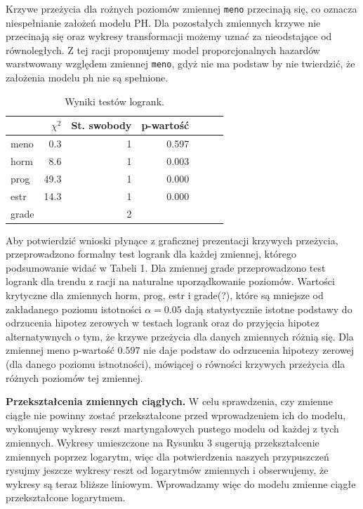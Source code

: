 \documentclass[]{article}
\begin{document}
Krzywe przeżycia dla rożnych poziomów zmiennej \texttt{meno} przecinają
się, co oznacza niespełnianie założeń modelu PH. Dla pozostałych
zmiennych krzywe nie przecinają się oraz wykresy transformacji możemy
uznać za nieodstające od równoległych. Z tej racji proponujemy model
proporcjonalnych hazardów warstwowany względem zmiennej \texttt{meno},
gdyż nie ma podstaw by nie twierdzić, że założenia modelu ph nie są
spełnione.

\begin{table}
\vspace{-20pt}
\caption{ Wyniki testów logrank. }
\begin{tabular}{lrrrrrr}
\toprule%
\ &$\chi^2$&St. swobody&p-wartość\\ \toprule meno&0.3&1&0.597\\ horm&8.6&1&0.003\\ prog&49.3&1&0.000\\ estr&14.3&1&0.000\\ grade&&2&\\  \bottomrule
\end{tabular}
\vspace{-7.5pt}
\end{table}

Aby potwierdzić wnioski płynące z graficznej prezentacji krzywych
przeżycia, przeprowadzono formalny test logrank dla każdej zmiennej,
którego podsumowanie widać w Tabeli 1. Dla zmiennej grade przeprowadzono
test logrank dla trendu z racji na naturalne uporządkowanie poziomów.
Wartości krytyczne dla zmiennych \textsf{horm}, \textsf{prog},
\textsf{estr} i \textsf{grade}(?), które są mniejsze od zakładanego
poziomu istotności \(\alpha=0.05\) dają statystycznie istotne podstawy
do odrzucenia hipotez zerowych w testach logrank oraz do przyjęcia
hipotez alternatywnych o tym, że krzywe przeżycia dla danych zmiennych
różnią się. Dla zmiennej \textsf{meno} p-wartość \(0.597\) nie daje
podstaw do odrzucenia hipotezy zerowej (dla danego poziomu istnotności),
mówiącej o równości krzywych przeżycia dla różnych poziomów tej
zmiennej.

\newpage
\textbf{Przekształcenia zmiennych ciągłych.} \newline
W celu sprawdzenia, czy zmienne ciągłe nie powinny zostać przekształcone
przed wprowadzeniem ich do modelu, wykonujemy wykresy reszt
martyngałowych pustego modelu od każdej z tych zmiennych. Wykresy
umieszczone na Rysunku 3 sugerują przekształcenie zmiennych poprzez
logarytm, więc dla potwierdzenia naszych przypuszczeń rysujmy jeszcze
wykresy reszt od logarytmów zmiennych i obserwujemy, że wykresy są teraz
bliższe liniowym. Wprowadzamy więc do modelu zmienne ciągłe
przekształcone logarytmem.
\end{document}
